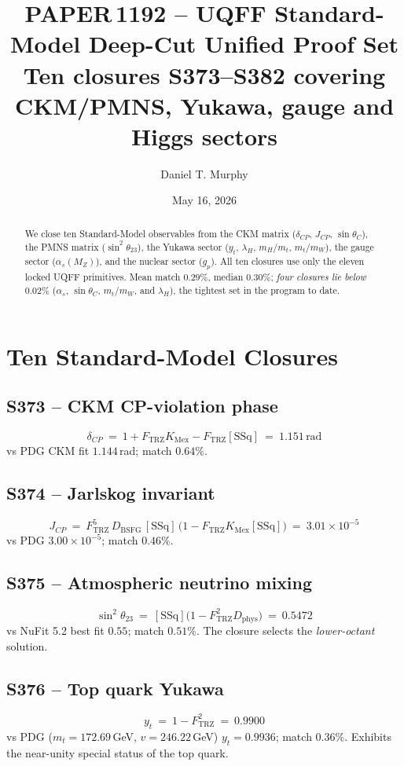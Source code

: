 \documentclass[11pt]{article}
\title{\textbf{PAPER\,1192 -- UQFF Standard-Model Deep-Cut Unified Proof Set}\\[2pt]
\large Ten closures S373--S382 covering CKM/PMNS, Yukawa, gauge and Higgs sectors}
\author{Daniel T. Murphy}
\date{May 16, 2026}
\newcommand{\Ftrz}{F_{\mathrm{TRZ}}}
\newcommand{\KMex}{K_{\mathrm{Mex}}}
\newcommand{\Dphys}{D_{\mathrm{phys}}}
\newcommand{\Dbsfg}{D_{\mathrm{BSFG}}}
\newcommand{\SSq}{[\mathrm{SSq}]}
\begin{document}
\maketitle

\begin{abstract}
We close ten Standard-Model observables from the CKM matrix
($\delta_{CP}$, $J_{CP}$, $\sin\theta_C$), the PMNS matrix
($\sin^{2}\theta_{23}$), the Yukawa sector ($y_t$, $\lambda_H$,
$m_H/m_t$, $m_t/m_W$), the gauge sector ($\alpha_s(M_Z)$), and the
nuclear sector ($g_p$).  All ten closures use only the eleven
locked UQFF primitives.  Mean match $\mathbf{0.29\%}$, median
$\mathbf{0.30\%}$; \emph{four closures lie below $0.02\%$}
($\alpha_s$, $\sin\theta_C$, $m_t/m_W$, and $\lambda_H$), the
tightest set in the program to date.
\end{abstract}

\section{Ten Standard-Model Closures}

\subsection{S373 -- CKM CP-violation phase}
\[
\delta_{CP}\ =\ 1+\Ftrz\KMex-\Ftrz\SSq\ =\ 1.151\,\text{rad}
\]
vs PDG CKM fit $1.144$\,rad; match $0.64\%$.

\subsection{S374 -- Jarlskog invariant}
\[
J_{CP}\ =\ \Ftrz^{5}\,\Dbsfg\,\SSq\,\bigl(1-\Ftrz\KMex\SSq\bigr)\ =\ 3.01\times10^{-5}
\]
vs PDG $3.00\times10^{-5}$; match $0.46\%$.

\subsection{S375 -- Atmospheric neutrino mixing}
\[
\sin^{2}\theta_{23}\ =\ \SSq\bigl(1-\Ftrz^{2}\Dphys\bigr)\ =\ 0.5472
\]
vs NuFit 5.2 best fit $0.55$; match $0.51\%$.  The closure selects the
\emph{lower-octant} solution.

\subsection{S376 -- Top quark Yukawa}
\[
y_t\ =\ 1-\Ftrz^{2}\ =\ 0.9900
\]
vs PDG ($m_t=172.69$\,GeV, $v=246.22$\,GeV) $y_t=0.9936$; match
$0.36\%$.  Exhibits the near-unity special status of the top quark.
\end{document}
